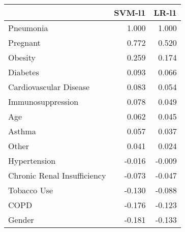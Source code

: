 \begin{tabular}{lrr}
\toprule
{} &  SVM-l1 &  LR-l1 \\
\midrule
Pneumonia                   &   1.000 &  1.000 \\
Pregnant                    &   0.772 &  0.520 \\
Obesity                     &   0.259 &  0.174 \\
Diabetes                    &   0.093 &  0.066 \\
Cardiovascular Disease      &   0.083 &  0.054 \\
Immunosuppression           &   0.078 &  0.049 \\
Age                         &   0.062 &  0.045 \\
Asthma                      &   0.057 &  0.037 \\
Other                       &   0.041 &  0.024 \\
Hypertension                &  -0.016 & -0.009 \\
Chronic Renal Insufficiency &  -0.073 & -0.047 \\
Tobacco Use                 &  -0.130 & -0.088 \\
COPD                        &  -0.176 & -0.123 \\
Gender                      &  -0.181 & -0.133 \\
\bottomrule
\end{tabular}
